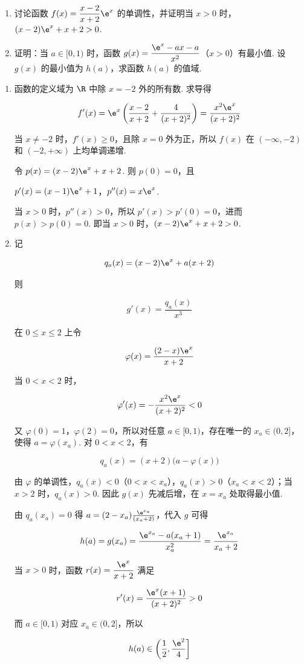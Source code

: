 \begin{problem}
\begin{enumerate}
\item 讨论函数 \(f(x)=\dfrac{x-2}{x+2}\e^x\) 的单调性，并证明当 \(x>0\) 时，\((x-2)\e^x+x+2>0\).
\item 证明：当 \(a\in[0,1)\) 时，函数 \(g(x)=\dfrac{\e^x-ax-a}{x^2}\)（\(x>0\)）有最小值. 设 \(g(x)\) 的最小值为 \(h(a)\)，求函数 \(h(a)\) 的值域.
\end{enumerate}
\end{problem}

\begin{solution}
\begin{enumerate}
\item 函数的定义域为 \(\R\) 中除 \(x=-2\) 外的所有数. 求导得

\[
f'(x)=\e^x\left(\frac{x-2}{x+2}+\frac4{(x+2)^2}\right)=\frac{x^2\e^x}{(x+2)^2}
\]

当 \(x\ne-2\) 时，\(f'(x)\geq0\)，且除 \(x=0\) 外为正，所以 \(f(x)\) 在 \((-\infty,-2)\) 和 \((-2,+\infty)\) 上均单调递增.

令 \(p(x)=(x-2)\e^x+x+2\). 则 \(p(0)=0\)，且

\(p'(x)=(x-1)\e^x+1\)，\(p''(x)=x\e^x\).

当 \(x>0\) 时，\(p''(x)>0\)，所以 \(p'(x)>p'(0)=0\)，进而 \(p(x)>p(0)=0\). 即当 \(x>0\) 时，\((x-2)\e^x+x+2>0\).

\item 记

\[
q_a(x)=(x-2)\e^x+a(x+2)
\]

则

\[
g'(x)=\frac{q_a(x)}{x^3}
\]

在 \(0\leq x\leq2\) 上令

\[
\varphi(x)=\frac{(2-x)\e^x}{x+2}
\]

当 \(0<x<2\) 时，

\[
\varphi'(x)=-\frac{x^2\e^x}{(x+2)^2}<0
\]

又 \(\varphi(0)=1\)，\(\varphi(2)=0\)，所以对任意 \(a\in[0,1)\)，存在唯一的 \(x_a\in(0,2]\)，使得 \(a=\varphi(x_a)\). 对 \(0<x<2\)，有

\[
q_a(x)=(x+2)\bigl(a-\varphi(x)\bigr)
\]

由 \(\varphi\) 的单调性，\(q_a(x)<0\)（\(0<x<x_a\)），\(q_a(x)>0\)（\(x_a<x<2\)）；当 \(x>2\) 时，\(q_a(x)>0\). 因此 \(g(x)\) 先减后增，在 \(x=x_a\) 处取得最小值.

由 \(q_a(x_a)=0\) 得 \(a=(2-x_a)\frac{\e^{x_a}}{(x_a+2)}\)，代入 \(g\) 可得

\[
h(a)=g(x_a)=\frac{\e^{x_a}-a(x_a+1)}{x_a^2}=\frac{\e^{x_a}}{x_a+2}
\]

当 \(x>0\) 时，函数 \(r(x)=\dfrac{\e^x}{x+2}\) 满足

\[
r'(x)=\frac{\e^x(x+1)}{(x+2)^2}>0
\]

而 \(a\in[0,1)\) 对应 \(x_a\in(0,2]\)，所以

\[
h(a)\in\left(\frac12,\frac{\e^2}{4}\right]
\]
\end{enumerate}
\end{solution}


